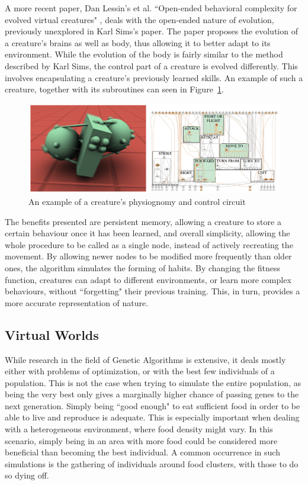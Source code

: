 A more recent paper, Dan Lessin's et al. ``Open-ended behavioral complexity for evolved virtual creatures" \cite{lessin2013open}, deals with the open-ended nature of evolution, previously unexplored in Karl Sims's paper. The paper proposes the evolution of a creature's brains as well as body, thus allowing it to better adapt to its environment. While the evolution of the body is fairly similar to the method described by Karl Sims, the control part of a creature is evolved differently. This involves encapsulating a creature's previously learned skills. An example of such a creature, together with its subroutines can seen in Figure~\ref{fig:open}.
\begin{figure}[!th]
	\centering
	\includegraphics[scale=1]{images/cirtualcreatures}
	\caption{\label{fig:open}An example of a creature's physiognomy and control circuit}
\end{figure}
The benefits presented are persistent memory, allowing a creature to store a certain behaviour once it has been learned, and overall simplicity, allowing the whole procedure to be called as a single node, instead of actively recreating the movement. By allowing newer nodes to be modified more frequently than older ones, the algorithm simulates the forming of habits. By changing the fitness function, creatures can adapt to different environments, or learn more complex behaviours, without ``forgetting" their previous training. This, in turn, provides a more accurate representation of nature.

\subsection{Virtual Worlds}
While research in the field of Genetic Algorithms is extensive, it deals mostly either with problems of optimization, or with the best few individuals of a population. This is not the case when trying to simulate the entire population, as being the very best only gives a marginally higher chance of passing genes to the next generation. Simply being ``good enough" to eat sufficient food in order to be able to live and reproduce is adequate. This is especially important when dealing with a heterogeneous environment, where food density might vary. In this scenario, simply being in an area with more food could be considered more beneficial than becoming the best individual. A common occurrence in such simulations is the gathering of individuals around food clusters, with those to do so dying off.

